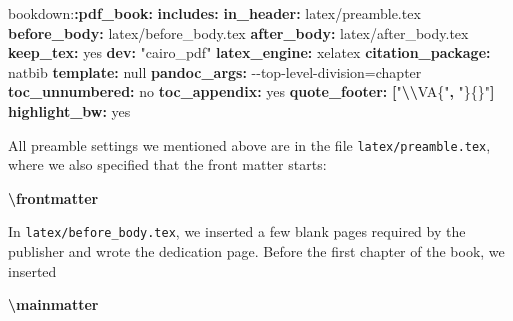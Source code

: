 \documentclass[
  12pt,
]{krantz}
\newenvironment{Shaded}{\begin{snugshade}}{\end{snugshade}}
\newcommand{\AttributeTok}[1]{\textcolor[rgb]{0.13,0.29,0.53}{#1}}
\newcommand{\CharTok}[1]{\textcolor[rgb]{0.31,0.60,0.02}{#1}}
\newcommand{\FunctionTok}[1]{\textcolor[rgb]{0.13,0.29,0.53}{\textbf{#1}}}
\newcommand{\KeywordTok}[1]{\textcolor[rgb]{0.13,0.29,0.53}{\textbf{#1}}}
\newcommand{\SpecialCharTok}[1]{\textcolor[rgb]{0.81,0.36,0.00}{\textbf{#1}}}
\newcommand{\StringTok}[1]{\textcolor[rgb]{0.31,0.60,0.02}{#1}}
\theoremstyle{definition}
\theoremstyle{definition}
\theoremstyle{definition}
\theoremstyle{definition}
\theoremstyle{remark}
\begin{document}
\begin{Shaded}
\begin{Highlighting}[]
\AttributeTok{bookdown:}\FunctionTok{:pdf\_book}\KeywordTok{:}
\AttributeTok{  }\FunctionTok{includes}\KeywordTok{:}
\AttributeTok{    }\FunctionTok{in\_header}\KeywordTok{:}\AttributeTok{ latex/preamble.tex}
\AttributeTok{    }\FunctionTok{before\_body}\KeywordTok{:}\AttributeTok{ latex/before\_body.tex}
\AttributeTok{    }\FunctionTok{after\_body}\KeywordTok{:}\AttributeTok{ latex/after\_body.tex}
\AttributeTok{  }\FunctionTok{keep\_tex}\KeywordTok{:}\AttributeTok{ }\CharTok{yes}
\AttributeTok{  }\FunctionTok{dev}\KeywordTok{:}\AttributeTok{ }\StringTok{"cairo\_pdf"}
\AttributeTok{  }\FunctionTok{latex\_engine}\KeywordTok{:}\AttributeTok{ xelatex}
\AttributeTok{  }\FunctionTok{citation\_package}\KeywordTok{:}\AttributeTok{ natbib}
\AttributeTok{  }\FunctionTok{template}\KeywordTok{:}\AttributeTok{ }\CharTok{null}
\AttributeTok{  }\FunctionTok{pandoc\_args}\KeywordTok{:}\AttributeTok{ {-}{-}top{-}level{-}division=chapter}
\AttributeTok{  }\FunctionTok{toc\_unnumbered}\KeywordTok{:}\AttributeTok{ }\CharTok{no}
\AttributeTok{  }\FunctionTok{toc\_appendix}\KeywordTok{:}\AttributeTok{ }\CharTok{yes}
\AttributeTok{  }\FunctionTok{quote\_footer}\KeywordTok{:}\AttributeTok{ }\KeywordTok{[}\StringTok{"}\SpecialCharTok{\textbackslash{}\textbackslash{}}\StringTok{VA\{"}\KeywordTok{,}\AttributeTok{ }\StringTok{"\}\{\}"}\KeywordTok{]}
\AttributeTok{  }\FunctionTok{highlight\_bw}\KeywordTok{:}\AttributeTok{ }\CharTok{yes}
\end{Highlighting}
\end{Shaded}

All preamble settings we mentioned above are in the file \texttt{latex/preamble.tex}, where we also specified that the front matter starts:

\begin{Shaded}
\begin{Highlighting}[]
\FunctionTok{\textbackslash{}frontmatter}
\end{Highlighting}
\end{Shaded}

In \texttt{latex/before\_body.tex}, we inserted a few blank pages required by the publisher and wrote the dedication page.
Before the first chapter of the book, we inserted

\begin{Shaded}
\begin{Highlighting}[]
\FunctionTok{\textbackslash{}mainmatter}
\end{Highlighting}
\end{Shaded}
\end{document}
